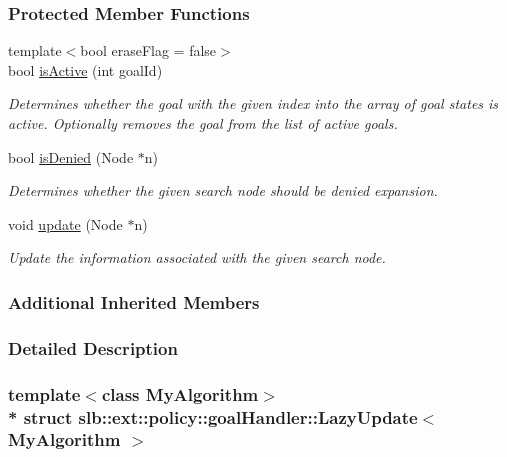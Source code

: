 \subsubsection*{Protected Member Functions}
\begin{DoxyCompactItemize}
\item 
{\footnotesize template$<$bool erase\+Flag = false$>$ }\\bool \hyperlink{structslb_1_1ext_1_1policy_1_1goalHandler_1_1LazyUpdate_a4b519c3c97577af690a8d46907b2e54e}{is\+Active} (int goal\+Id)
\begin{DoxyCompactList}\small\item\em Determines whether the goal with the given index into the array of goal states is active. Optionally removes the goal from the list of active goals. \end{DoxyCompactList}\item 
bool \hyperlink{structslb_1_1ext_1_1policy_1_1goalHandler_1_1LazyUpdate_a15b041cb372826b96a0fc3aa7b60bf41}{is\+Denied} (Node $\ast$n)
\begin{DoxyCompactList}\small\item\em Determines whether the given search node should be denied expansion. \end{DoxyCompactList}\item 
void \hyperlink{structslb_1_1ext_1_1policy_1_1goalHandler_1_1LazyUpdate_a91893e23cc1343a5e0e52a850f07f699}{update} (Node $\ast$n)
\begin{DoxyCompactList}\small\item\em Update the information associated with the given search node. \end{DoxyCompactList}\end{DoxyCompactItemize}
\subsubsection*{Additional Inherited Members}


\subsubsection{Detailed Description}
\subsubsection*{template$<$class My\+Algorithm$>$\\*
struct slb\+::ext\+::policy\+::goal\+Handler\+::\+Lazy\+Update$<$ My\+Algorithm $>$}


